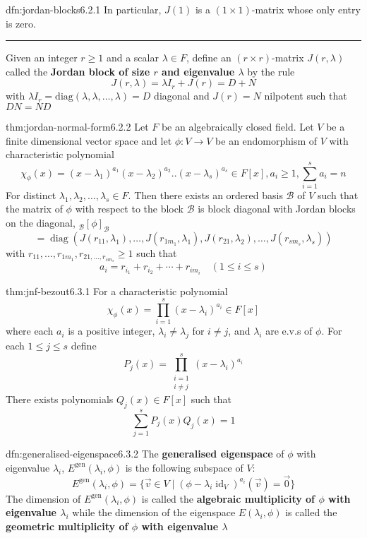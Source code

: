 \documentclass[landscape, 8pt]{extarticle}
\DeclareMathOperator{\id}{id}
\DeclareMathOperator{\diag}{diag}
\begin{document}
\begin{multicols}{3}
\begin{dfn}{dfn:jordan-blocks}{6.2.1}
    In particular, $J(1)$ is a $(1 \times 1)$-matrix whose only entry is zero.

    \noindent\rule{\textwidth}{0.2pt}
    Given an integer $r \ge 1$ and a scalar $\lambda\in F$, define an $(r \times r)$-matrix $J(r, \lambda)$ called the \textbf{Jordan block of size $r$ and eigenvalue $\lambda$} by the rule
    \[J(r, \lambda) = \lambda I_{r} + J(r) = D + N\]
    with $\lambda I_{r} = \text{diag}(\lambda, \lambda,\dots, \lambda) = D$ diagonal and $J(r) = N$ nilpotent such that $DN = ND$
\end{dfn}


\begin{thm}{thm:jordan-normal-form}{6.2.2}
    Let $F$ be an algebraically closed field. Let $V$ be a finite dimensional vector space and let $\phi : V \to V$ be an endomorphism of $V$ with characteristic polynomial
    \[\chi_{\phi}(x) = (x - \lambda_{1})^{a_{1}}(x - \lambda_{2})^{a_{2}} . . (x - \lambda_{s})^{a_{s}}\in F[x], a_{i} \ge 1, \sum_{i = 1}^{s} a_{i} = n\]
    For distinct $\lambda_{1},\lambda_{2},\dots,\lambda_{s}\in F$. Then there exists an ordered basis $\mathcal{B}$ of $V$ such that the matrix of $\phi$ with respect to the block $\mathcal{B}$ is block diagonal with Jordan blocks on the diagonal, ${}_{\mathcal{B}}[\phi]_{\mathcal{B}}$
    \[ = \diag(J(r_{11}, \lambda_{1}),\dots,J(r_{1m_{1}}, \lambda_{1}), J(r_{21}, \lambda_{2}),\dots,J(r_{sm_{s}}, \lambda_{s}))\]
    with $r_{11},\dots,r_{1m_{1}}, r_{21,\dots,r_{sm_{s}}} \ge 1$ such that
    \[a_{i} = r_{i_{1}} + r_{i_{2}} + \cdots + r_{im_{i}} \quad (1 \le i \le s)\]
\end{thm}

\begin{thm}{thm:jnf-bezout}{6.3.1}
    For a characteristic polynomial
    \[\chi_{\phi}(x) = \prod_{i = 1}^{s} (x - \lambda_{i})^{a_{i}}\in F[x]\]
    where each $a_{i}$ is a positive integer, $\lambda_{i} \ne \lambda_{j}$ for $i\ne j$, and $\lambda_{i}$ are e.v.s of $\phi$. For each $1\le j \le s$ define
    \[P_{j}(x) = \prod_{\substack{i = 1 \\ i \ne j}}^{s} (x - \lambda_{i})^{a_{i}}\]
    There exists polynomials $Q_{j}(x)\in F[x]$ such that
    \[\sum_{j = 1}^{s} P_{j}(x)Q_{j}(x) = 1\]
\end{thm}

\begin{dfn}{dfn:generalised-eigenspace}{6.3.2}
    The \textbf{generalised eigenspace} of $\phi$ with eigenvalue $\lambda_{i}$, $E^{\text{gen}}(\lambda_{i}, \phi)$ is the following subspace of $V$:
    \[E^{\text{gen}}(\lambda_{i}, \phi) = \{\vec{v}\in V \mid (\phi - \lambda_{i} \id_{V})^{a_{i}} (\vec{v}) = \vec{0}\}\]
    The dimension of $E^{\text{gen}}(\lambda_{i}, \phi)$ is called the \textbf{algebraic multiplicity of $\phi$ with eigenvalue $\lambda_{i}$} while the dimension of the eigenspace $E(\lambda_{i}, \phi)$ is called the \textbf{geometric multiplicity of $\phi$ with eigenvalue $\lambda$}


\end{dfn}
\end{multicols}
\end{document}
